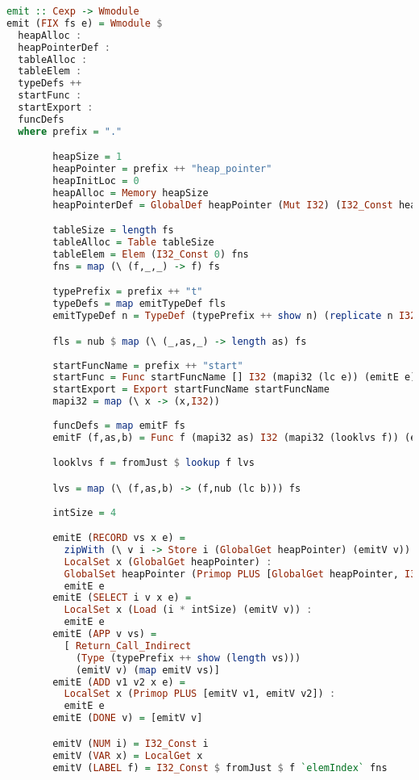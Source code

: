 \begin{lstlisting}[language=Haskell]
emit :: Cexp -> Wmodule
emit (FIX fs e) = Wmodule $
  heapAlloc : 
  heapPointerDef :
  tableAlloc :
  tableElem :
  typeDefs ++
  startFunc :
  startExport :
  funcDefs
  where prefix = "."

        heapSize = 1
        heapPointer = prefix ++ "heap_pointer"
        heapInitLoc = 0
        heapAlloc = Memory heapSize
        heapPointerDef = GlobalDef heapPointer (Mut I32) (I32_Const heapInitLoc)

        tableSize = length fs
        tableAlloc = Table tableSize
        tableElem = Elem (I32_Const 0) fns
        fns = map (\ (f,_,_) -> f) fs

        typePrefix = prefix ++ "t"
        typeDefs = map emitTypeDef fls
        emitTypeDef n = TypeDef (typePrefix ++ show n) (replicate n I32) I32

        fls = nub $ map (\ (_,as,_) -> length as) fs 
        
        startFuncName = prefix ++ "start"
        startFunc = Func startFuncName [] I32 (mapi32 (lc e)) (emitE e)
        startExport = Export startFuncName startFuncName
        mapi32 = map (\ x -> (x,I32))
        
        funcDefs = map emitF fs
        emitF (f,as,b) = Func f (mapi32 as) I32 (mapi32 (looklvs f)) (emitE b)

        looklvs f = fromJust $ lookup f lvs

        lvs = map (\ (f,as,b) -> (f,nub (lc b))) fs
        
        intSize = 4

        emitE (RECORD vs x e) =
          zipWith (\ v i -> Store i (GlobalGet heapPointer) (emitV v)) vs [0,intSize..] ++
          LocalSet x (GlobalGet heapPointer) :
          GlobalSet heapPointer (Primop PLUS [GlobalGet heapPointer, I32_Const (length vs * intSize)]) :
          emitE e
        emitE (SELECT i v x e) =
          LocalSet x (Load (i * intSize) (emitV v)) :
          emitE e
        emitE (APP v vs) =
          [ Return_Call_Indirect
            (Type (typePrefix ++ show (length vs)))
            (emitV v) (map emitV vs)]
        emitE (ADD v1 v2 x e) =
          LocalSet x (Primop PLUS [emitV v1, emitV v2]) :
          emitE e
        emitE (DONE v) = [emitV v]

        emitV (NUM i) = I32_Const i
        emitV (VAR x) = LocalGet x
        emitV (LABEL f) = I32_Const $ fromJust $ f `elemIndex` fns
\end{lstlisting}
